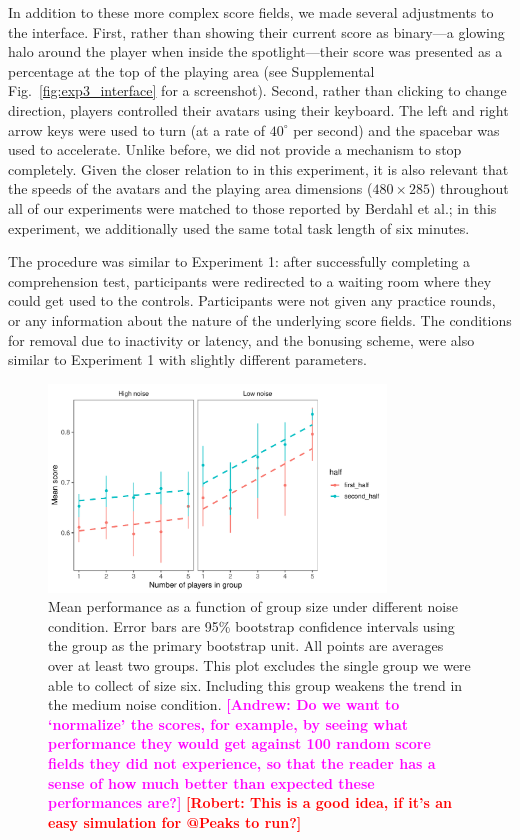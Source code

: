 \documentclass[12pt,letterpaper]{article}
\newcommand{\andrew}[1]{\textcolor{magenta}{\bf [Andrew: #1]}}
\newcommand{\rdh}[1]{\textcolor{red}{\bf [Robert: #1]}}
\begin{document}
In addition to these more complex score fields, we made several adjustments to the interface.
First, rather than showing their current score as binary---a glowing halo around the player when inside the spotlight---their score was presented as a percentage at the top of the playing area (see Supplemental Fig.~\ref{fig:exp3_interface} for a screenshot).
Second, rather than clicking to change direction, players controlled their avatars using their keyboard. 
The left and right arrow keys were used to turn (at a rate of $40^\circ$ per second) and the
spacebar was used to accelerate. 
Unlike before, we did not provide a mechanism to stop completely.  
Given the closer relation to  in this experiment, it is also relevant that the speeds of the avatars and the playing area dimensions ($480 \times 285$) throughout all of our experiments were matched to those reported by Berdahl et al.; in this experiment, we additionally used the same total task length of six minutes.

The procedure was similar to Experiment 1: after successfully completing a comprehension test,  participants were redirected to a waiting room where they could get used to the controls.  
Participants were not given any practice rounds, or any information about the nature of the underlying score fields.
The conditions for removal due to inactivity or latency, and the bonusing scheme, were also similar to Experiment 1 with slightly different parameters.

\begin{figure}[th!]
  \centering
  \includegraphics[width=0.8\textwidth]{./figures/performance-summary}
  \caption{Mean performance as a function of group size under different noise condition.  Error bars are 95\% bootstrap confidence
    intervals using the group as the primary bootstrap unit.  All
    points are averages over at least two groups.  This plot excludes
    the single group we were able to collect of size six.  Including
    this group weakens the trend in the medium noise condition. \andrew{Do we want to `normalize' the scores, for example, by seeing what performance they would get against 100 random score fields they did not experience, so that the reader has a sense of how much better than expected these performances are?} \rdh{This is a good idea, if it's an easy simulation for @Peaks to run?}}
  \label{fig:performance}
\end{figure}
\end{document}
